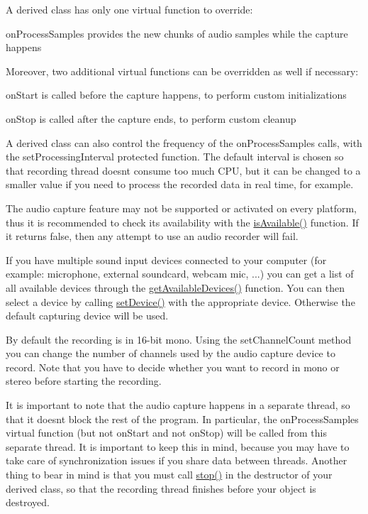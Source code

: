 A derived class has only one virtual function to override\+: \begin{DoxyItemize}
\item on\+Process\+Samples provides the new chunks of audio samples while the capture happens\end{DoxyItemize}
Moreover, two additional virtual functions can be overridden as well if necessary\+: \begin{DoxyItemize}
\item on\+Start is called before the capture happens, to perform custom initializations \item on\+Stop is called after the capture ends, to perform custom cleanup\end{DoxyItemize}
A derived class can also control the frequency of the on\+Process\+Samples calls, with the set\+Processing\+Interval protected function. The default interval is chosen so that recording thread doesn\textquotesingle{}t consume too much C\+PU, but it can be changed to a smaller value if you need to process the recorded data in real time, for example.

The audio capture feature may not be supported or activated on every platform, thus it is recommended to check its availability with the \mbox{\hyperlink{classsf_1_1_sound_recorder_aab2bd0fee9e48d6cfd449b1cb078ce5a}{is\+Available()}} function. If it returns false, then any attempt to use an audio recorder will fail.

If you have multiple sound input devices connected to your computer (for example\+: microphone, external soundcard, webcam mic, ...) you can get a list of all available devices through the \mbox{\hyperlink{classsf_1_1_sound_recorder_a26198c5c11efcd61f426f326fe314afe}{get\+Available\+Devices()}} function. You can then select a device by calling \mbox{\hyperlink{classsf_1_1_sound_recorder_a8eb3e473292c16e874322815836d3cd3}{set\+Device()}} with the appropriate device. Otherwise the default capturing device will be used.

By default the recording is in 16-\/bit mono. Using the set\+Channel\+Count method you can change the number of channels used by the audio capture device to record. Note that you have to decide whether you want to record in mono or stereo before starting the recording.

It is important to note that the audio capture happens in a separate thread, so that it doesn\textquotesingle{}t block the rest of the program. In particular, the on\+Process\+Samples virtual function (but not on\+Start and not on\+Stop) will be called from this separate thread. It is important to keep this in mind, because you may have to take care of synchronization issues if you share data between threads. Another thing to bear in mind is that you must call \mbox{\hyperlink{classsf_1_1_sound_recorder_a8d9c8346aa9aa409cfed4a1101159c4c}{stop()}} in the destructor of your derived class, so that the recording thread finishes before your object is destroyed.

